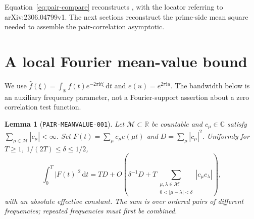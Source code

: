 \documentclass[11pt]{article}
\newtheorem{lemma}{Lemma}
\newcommand{\dd}{\,\mathrm d}
\newcommand{\ii}{\mathrm i}
\begin{document}
Equation~\eqref{eq:pair-compare} reconstructs
\cite[(2.18)]{BGSTB2024}, with the locator referring to
arXiv:2306.04799v1. The next sections reconstruct the prime-side
mean square needed to assemble the pair-correlation asymptotic.

\section{A local Fourier mean-value bound}

We use \(\widehat f(\xi)=\int_{\mathbb R}f(t)e^{-2\pi\ii t\xi}\dd t\)
and \(e(u)=e^{2\pi\ii u}\). The bandwidth below is an auxiliary
frequency parameter, not a Fourier-support assertion about a zero
correlation test function.

\begin{lemma}[\texttt{PAIR-MEANVALUE-001}]\label{lem:pair-meanvalue}
Let \(\mathcal M\subset\mathbb R\) be countable and
\(c_\mu\in\mathbb C\) satisfy \(\sum_{\mu\in\mathcal M}|c_\mu|<\infty\).
Set \(F(t)=\sum_\mu c_\mu e(\mu t)\) and \(D=\sum_\mu|c_\mu|^2\).
Uniformly for \(T\geq1\), \(1/(2T)\leq\delta\leq1/2\),
\begin{equation}\label{eq:local-meanvalue}
 \int_0^T|F(t)|^2\dd t
 =TD+O\left(\delta^{-1}D+
 T\sum_{\substack{\mu,\lambda\in\mathcal M\\0<|\mu-\lambda|<\delta}}
 |c_\mu c_\lambda|\right),
\end{equation}
with an absolute effective constant. The sum is over ordered pairs
of different frequencies; repeated frequencies must first be combined.
\end{lemma}
\end{document}
